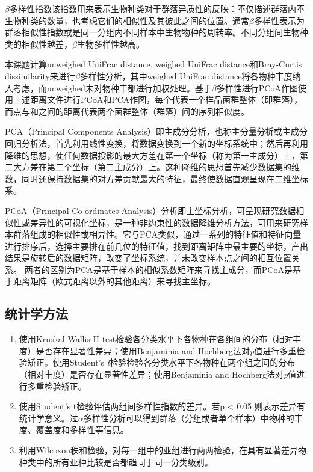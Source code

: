     $\beta$多样性指数该指数用来表示生物种类对于群落异质性的反映：不仅描述群落内不生物种类的数量，也考虑它们的相似性及其彼此之间的位置。通常$\beta$多样性表示为群落相似性指数或是同一分组内不同样本中生物物种的周转率。不同分组间生物种类的相似性越差，$\beta$生物多样性越高。

    本课题计算unweighed UniFrac distance, weighed UniFrac distance和Bray-Curtis dissimilarity来进行$\beta$多样性分析，其中weighed UniFrac distance将各物种丰度纳入考虑，而unweighed未对物种丰都进行加权处理。基于$\beta$多样性进行PCoA作图使用上述距离文件进行PCoA和PCA作图，每个代表一个样品菌群整体（即群落），而点与和之间的距离代表两个菌群整体（群落）间的序列相似度。

    PCA（Principal Components Analysis）即主成分分析，也称主分量分析或主成分回归分析法，首先利用线性变换，将数据变换到一个新的坐标系统中；然后再利用降维的思想，使任何数据投影的最大方差在第一个坐标（称为第一主成分）上，第二大方差在第二个坐标（第二主成分）上。这种降维的思想首先减少数据集的维数，同时还保持数据集的对方差贡献最大的特征，最终使数据直观呈现在二维坐标系。

    PCoA（Principal Co-ordinates Analysis）分析即主坐标分析，可呈现研究数据相似性或差异性的可视化坐标，是一种非约束性的数据降维分析方法，可用来研究样本群落组成的相似性或相异性。它与PCA类似，通过一系列的特征值和特征向量进行排序后，选择主要排在前几位的特征值，找到距离矩阵中最主要的坐标，产出结果是旋转后的数据矩阵，改变了坐标系统，并未改变样本点之间的相互位置关系。
    两者的区别为PCA是基于样本的相似系数矩阵来寻找主成分，而PCoA是基于距离矩阵（欧式距离以外的其他距离）来寻找主坐标。

  \subsection{统计学方法}
  \label{统计学方法}
    \begin{enumerate}
      \item 使用Kruskal-Wallis H test检验各分类水平下各物种在各组间的分布（相对丰度）是否存在显著性差异；使用Benjaminia and Hochberg法对\textit{p}值进行多重检验矫正。使用Student’s \textit{t}检验检验各分类水平下各物种在两个组之间的分布（相对丰度）是否存在显著性差异；使用Benjaminia and Hochberg法对\textit{p}值进行多重检验矫正。
      \item 使用Student’s t检验评估两组间多样性指数的差异。若p < 0.05 则表示差异有统计学意义。过$\alpha$多样性分析可以得到群落（分组或者单个样本）中物种的丰度、覆盖度和多样性等信息。
      \item 利用Wilcoxon秩和检验，对每一组中的亚组进行两两检验，在具有显著差异物种类中的所有亚种比较是否都趋同于同一分类级别。
    \end{enumerate}

